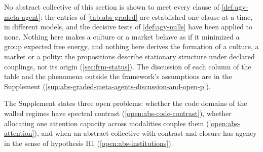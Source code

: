 No abstract collective of this section is shown to meet every clause of \cref{def:agy-meta-agent}: the entries of \cref{tab:abs-graded} are established one clause at a time, in different models, and the decisive tests of \cref{def:agy-nulls} have been applied to none. Nothing here makes a culture or a market behave as if it minimized a group expected free energy, and nothing here derives the formation of a culture, a market or a polity: the propositions describe stationary structure under declared couplings, not its origin (\cref{sec:frm-status}). The discussion of each column of the table and the phenomena outside the framework's assumptions are in the Supplement (\cref{sup:abs-graded-meta-agents-discussion-and-open-p}).

The Supplement states three open problems: whether the code domains of the walled regimes have spectral contrast (\cref{open:abs-code-contrast}), whether allocating one attention capacity across modalities couples them (\cref{open:abs-attention}), and when an abstract collective with contrast and closure has agency in the sense of hypothesis H1 (\cref{open:abs-institutions}).
